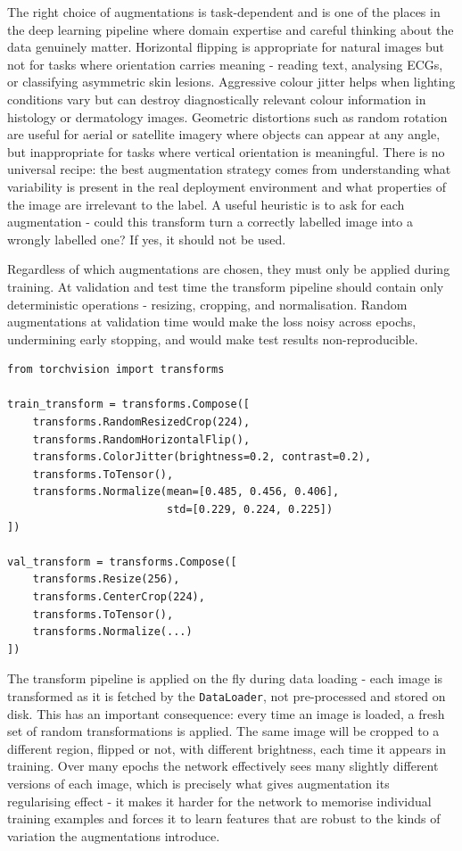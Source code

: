 The right choice of augmentations is task-dependent and is one of the places in the deep learning pipeline where domain expertise and careful thinking about the data genuinely matter. Horizontal flipping is appropriate for natural images but not for tasks where orientation carries meaning - reading text, analysing ECGs, or classifying asymmetric skin lesions. Aggressive colour jitter helps when lighting conditions vary but can destroy diagnostically relevant colour information in histology or dermatology images. Geometric distortions such as random rotation are useful for aerial or satellite imagery where objects can appear at any angle, but inappropriate for tasks where vertical orientation is meaningful. There is no universal recipe: the best augmentation strategy comes from understanding what variability is present in the real deployment environment and what properties of the image are irrelevant to the label. A useful heuristic is to ask for each augmentation - could this transform turn a correctly labelled image into a wrongly labelled one? If yes, it should not be used.

Regardless of which augmentations are chosen, they must only be applied during training. At validation and test time the transform pipeline should contain only deterministic operations - resizing, cropping, and normalisation. Random augmentations at validation time would make the loss noisy across epochs, undermining early stopping, and would make test results non-reproducible.

\begin{verbatim}
from torchvision import transforms

train_transform = transforms.Compose([
    transforms.RandomResizedCrop(224),
    transforms.RandomHorizontalFlip(),
    transforms.ColorJitter(brightness=0.2, contrast=0.2),
    transforms.ToTensor(),
    transforms.Normalize(mean=[0.485, 0.456, 0.406],
                         std=[0.229, 0.224, 0.225])
])

val_transform = transforms.Compose([
    transforms.Resize(256),
    transforms.CenterCrop(224),
    transforms.ToTensor(),
    transforms.Normalize(...)
])
\end{verbatim}

The transform pipeline is applied on the fly during data loading - each image is transformed as it is fetched by the \texttt{DataLoader}, not pre-processed and stored on disk. This has an important consequence: every time an image is loaded, a fresh set of random transformations is applied. The same image will be cropped to a different region, flipped or not, with different brightness, each time it appears in training. Over many epochs the network effectively sees many slightly different versions of each image, which is precisely what gives augmentation its regularising effect - it makes it harder for the network to memorise individual training examples and forces it to learn features that are robust to the kinds of variation the augmentations introduce.

